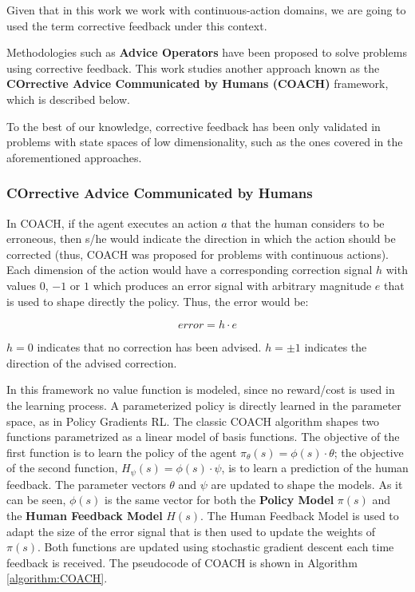Given that in this work we work with continuous-action domains, we are going to used the term corrective feedback under this context.  

Methodologies such as \textbf{Advice Operators} \cite{Argall2009, Argall2008} have been proposed to solve problems using corrective feedback. This work studies another approach known as the \textbf{COrrective Advice Communicated by Humans (COACH)} \cite{Celemin2018AnInteractive} framework, which is described below. 

To the best of our knowledge, corrective feedback has been only validated in problems with state spaces of low dimensionality, such as the ones covered in the aforementioned approaches. 

\newpage

\subsubsection{COrrective Advice Communicated by Humans}
\label{sss:COACH}
In COACH, if the agent executes an action $a$ that the human considers to be erroneous, then s/he would indicate the direction in which the action should be corrected (thus, COACH was proposed for problems with continuous actions). Each dimension of the action would have a corresponding correction signal $h$ with values $0$, $-1$ or $1$ which produces an error signal with arbitrary magnitude $e$ that is used to shape directly the policy. Thus, the error would be: 

\begin{equation}\label{eq:error}
    error=h \cdot e
\end{equation}

$h=0$ indicates that no correction has been advised. $h=\pm 1$ indicates the direction of the advised correction.

In this framework no value function is modeled, since no reward/cost is used in the learning process. A parameterized policy is directly learned in the parameter space, as in Policy Gradients RL. 
The classic COACH algorithm shapes two functions parametrized as a linear model of basis functions. The objective of the first function is to learn the policy of the agent $\pi_{\theta}(s)=\phi(s) \cdot \theta$; the objective of the second function, $H_{\psi}(s)=\phi(s) \cdot \psi$, is to learn a prediction of the human feedback. The parameter vectors $\theta$ and $\psi$ are updated to shape the models. As it can be seen, $\phi(s)$ is the same vector for both the \textbf{Policy Model} $\pi(s)$ and the \textbf{Human Feedback Model}  $H(s)$. The Human Feedback Model is used to adapt the size of the error signal that is then used to update the weights of $\pi(s)$. Both functions are updated using stochastic gradient descent each time feedback is received. The pseudocode of COACH is shown in Algorithm \ref{algorithm:COACH}.

